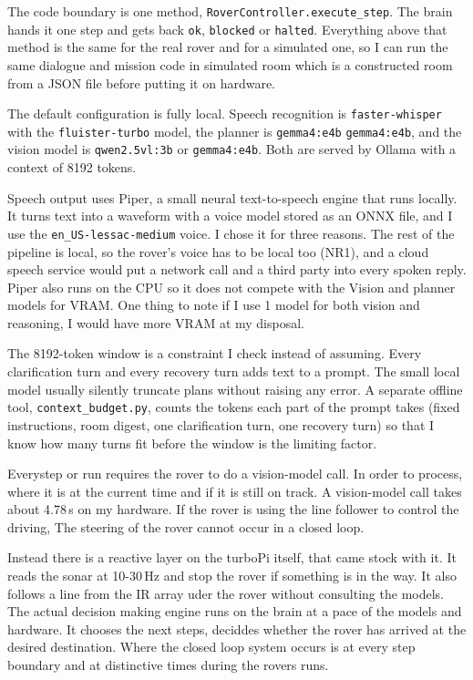 The code boundary is one method, \texttt{RoverController.execute\_step}. The brain
hands it one step and gets back \texttt{ok}, \texttt{blocked} or \texttt{halted}.
Everything above that method is the same for the real rover and for a simulated
one, so I can run the same dialogue and mission code in simulated room which is a constructed 
room from a JSON file before
putting it on hardware.

The default configuration is fully local. Speech recognition is
\texttt{faster-whisper} with the \texttt{fluister-turbo} model, the planner is
\texttt{gemma4:e4b} \texttt{gemma4:e4b}, and the vision model is \texttt{qwen2.5vl:3b} or \texttt{gemma4:e4b}. Both are
served by Ollama with a context of 8192 tokens. 


Speech output uses Piper, a small neural text-to-speech engine that runs locally.
It turns text into a waveform with a voice model stored as an ONNX file, and I use
the \texttt{en\_US-lessac-medium} voice. I chose it for three reasons. The rest of
the pipeline is local, so the rover's voice has to be local too (NR1), and a cloud
speech service would put a network call and a third party into every spoken
reply. Piper also runs on the CPU so it does not compete with the Vision and planner models
for VRAM. One thing to note if I use 1 model for both vision and reasoning, I would have 
more VRAM at my disposal.

The 8192-token window is a constraint I check instead of assuming. Every
clarification turn and every recovery turn adds text
to a prompt. The small local model usually silently truncate plans without
raising any error. A separate offline tool, \texttt{context\_budget.py}, counts
the tokens each part of the prompt takes (fixed instructions, room digest, one
clarification turn, one recovery turn) so that I know how many turns fit before the
window is the limiting factor. 

\label{ssec:rates}

Everystep or run requires the rover to do a vision-model call. In order to process, where
it is at the current time and if it is still on track. A vision-model call takes about 4.78\,s
on my hardware. If the rover is using the line follower to control the driving, The steering of the rover
cannot occur in a closed loop. 

Instead there is a reactive layer on the turboPi itself, that came stock with it. It reads the sonar at 10-30\,Hz
and stop the rover if something is in the way. It also follows a line from the IR array uder the rover without consulting 
the models. The actual decision making engine runs on the brain at a pace  of the models and hardware. It chooses the next steps,
deciddes whether the rover has arrived at the desired destination. Where the closed loop system occurs is at 
every step boundary and at distinctive times during the rovers runs. 


